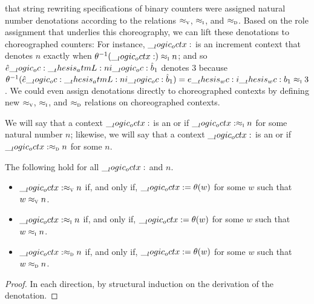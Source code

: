  that string rewriting specifications of binary counters were assigned natural number denotations according to the relations $ \approx\sb{\text{\normalfont\scshape v}} $, $ \approx\sb{\text{\normalfont\scshape i}} $, and $ \approx\sb{\text{\normalfont\scshape d}} $.
Based on the role assignment that underlies this choreography, we can lift these denotations to choreographed counters:
For instance, $\__logic_octx:$ is an increment context that denotes $n$ exactly when $\theta^{-1}(\__logic_octx:) \approx\sb{\text{\normalfont\scshape i}} n$; and so $\hat{e} \__logic_oc: \__thesis_atmL:n {i} \__logic_oc: \hat{b}_1$ denotes $3$ because $\theta^{-1}(\defp{e} \oc \atmL{i} \oc \defp{b}_1) = \ainc{e \wc i \wc b_1}{3}$.
We could even assign denotations directly to choreographed contexts by defining new $ \approx\sb{\text{\normalfont\scshape v}} $, $ \approx\sb{\text{\normalfont\scshape i}} $, and $ \approx\sb{\text{\normalfont\scshape d}} $ relations on choreographed contexts.
We will say that a context $\__logic_octx:$ is an  or  if $\__logic_octx: \approx\sb{\text{\normalfont\scshape i}} n$ for some natural number $n$;
likewise, we will say that a context $\__logic_octx:$ is an  or  if $\__logic_octx: \approx\sb{\text{\normalfont\scshape d}} n$ for some $n$.

\begin{theorem}
  The following hold for all $\__logic_octx:$ and $n$.
  \begin{itemize}[nosep]
  \item $\__logic_octx: \approx\sb{\text{\normalfont\scshape v}} n$ if, and only if, $\__logic_octx: = \theta(w)$ for some $w$ such that $w \approx\sb{\text{\normalfont\scshape v}} n$.
  \item $\__logic_octx: \approx\sb{\text{\normalfont\scshape i}} n$ if, and only if, $\__logic_octx: = \theta(w)$ for some $w$ such that $w \approx\sb{\text{\normalfont\scshape i}} n$.
  \item $\__logic_octx: \approx\sb{\text{\normalfont\scshape d}} n$ if, and only if, $\__logic_octx: = \theta(w)$ for some $w$ such that $w \approx\sb{\text{\normalfont\scshape d}} n$.
  \end{itemize}
\end{theorem}
\begin{proof}
  In each direction, by structural induction on the derivation of the denotation.
\end{proof}

